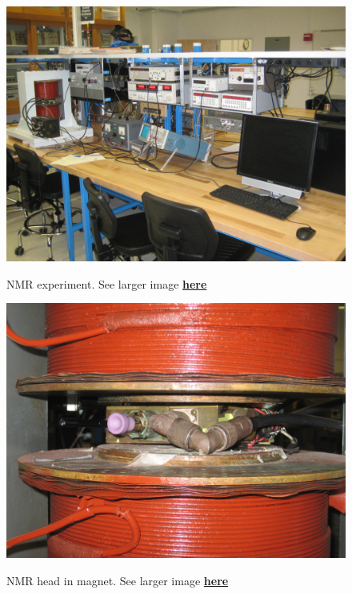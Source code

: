 \documentclass{../lab}
\begin{document}
\begin{figure}[h]
\begin{minipage}{0.33\textwidth}
    \href{http://experimentationlab.berkeley.edu/sites/default/files/images/NMR_Exp_3559.jpg}{\includegraphics[width=\linewidth,keepaspectratio]{images/NMR_Exp_3559.jpg}}
    \caption{NMR experiment. See larger image \href{http://experimentationlab.berkeley.edu/sites/default/files/images/NMR_Exp_3559.jpg}{\textbf{here}}}
\end{minipage}
\begin{minipage}{0.36\textwidth}
    \href{http://experimentationlab.berkeley.edu/sites/default/files/images/NMR_Head-in-Magnet_3560.jpg}{\includegraphics[width=\linewidth,keepaspectratio]{images/NMR_Head-in-Magnet_3560.jpg}}
    \caption{NMR head in magnet. See larger image \href{http://experimentationlab.berkeley.edu/sites/default/files/images/NMR_Head-in-Magnet_3560.jpg}{\textbf{here}}}

\end{minipage}
\end{figure}
\end{document}
